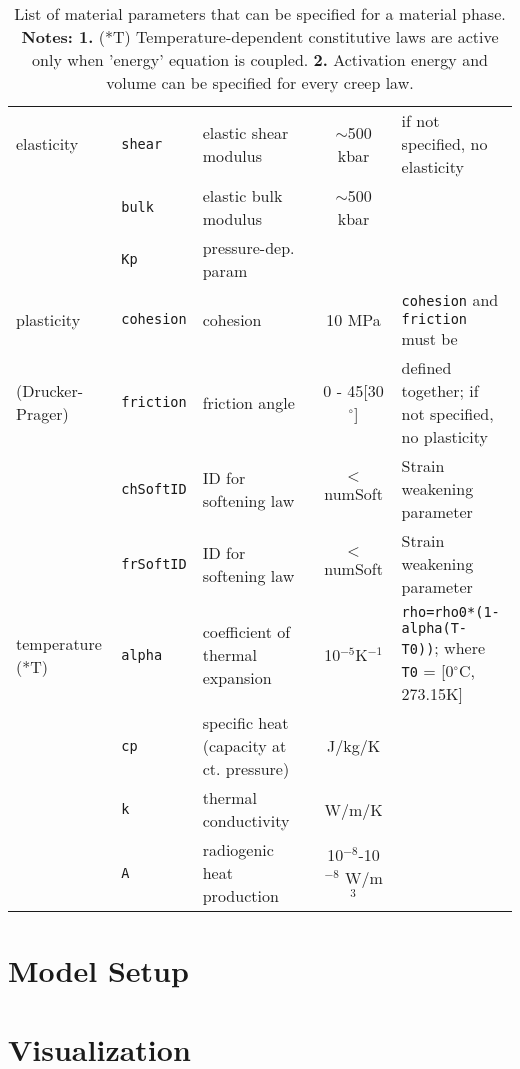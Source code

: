 \documentclass[a4paper,11pt]{article}
\begin{document}
\begin{table}[H]
\begin{center}
{\begin{tabular}{p{2.7cm} p{3cm} p{3cm} c p{5cm}}
\hdashline
elasticity&\texttt{shear}&elastic shear modulus&$\sim$500 kbar&if not specified, no elasticity\\
&\texttt{bulk}&elastic bulk modulus&$\sim$500 kbar&\\
&\texttt{Kp}&pressure-dep. param&&\\

\hdashline
plasticity &\texttt{cohesion}&cohesion&10 MPa&\texttt{cohesion} and \texttt{friction} must be \\
(Drucker-Prager)&\texttt{friction}&friction angle&0 - 45[30$^\circ$]&defined together; if not specified, no plasticity\\
&\texttt{chSoftID}&ID for softening law&$<$ numSoft&Strain weakening parameter\\
&\texttt{frSoftID}&ID for softening law&$<$ numSoft&Strain weakening parameter\\


\hdashline
temperature  (*T)&\texttt{alpha}&coefficient of thermal expansion&10$^{-5}$K$^{-1}$&\texttt{rho=rho0*(1-alpha(T-T0))}; where \texttt{T0} = [0$^\circ$C, 273.15K]\\
&\texttt{cp}&specific heat (capacity at ct. pressure)&J/kg/K&\\
&\texttt{k}&thermal conductivity&W/m/K&\\
&\texttt{A}&radiogenic heat production&10$^{-8}$-10$^{-8}$ W/m$^3$ &\\

 \hline
     \end{tabular}
     }
  \caption{List of material parameters that can be specified for a material phase. \textbf{Notes: 1.} (*T) Temperature-dependent constitutive laws are active only when 'energy' equation is coupled. \textbf{2.} Activation energy and volume can be specified for every creep law.}
  \label{tab:matprops}
  \end{center}
\end{table}

\section{Model Setup}
\label{sec:modelsetup}

\section{Visualization}



\end{document}
